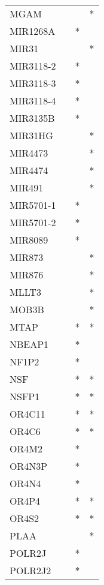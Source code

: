 \begin{longtable}{lccc}
MGAM         &       &    &       * \\
MIR1268A     &       &  * &         \\
MIR31        &       &    &       * \\
MIR3118-2    &       &  * &         \\
MIR3118-3    &       &  * &         \\
MIR3118-4    &       &  * &         \\
MIR3135B     &       &  * &         \\
MIR31HG      &       &    &       * \\
MIR4473      &       &    &       * \\
MIR4474      &       &    &       * \\
MIR491       &       &    &       * \\
MIR5701-1    &       &  * &         \\
MIR5701-2    &       &  * &         \\
MIR8089      &       &  * &         \\
MIR873       &       &    &       * \\
MIR876       &       &    &       * \\
MLLT3        &       &    &       * \\
MOB3B        &       &    &       * \\
MTAP         &       &  * &       * \\
NBEAP1       &       &  * &         \\
NF1P2        &       &  * &         \\
NSF          &       &  * &       * \\
NSFP1        &       &  * &       * \\
OR4C11       &       &  * &       * \\
OR4C6        &       &  * &       * \\
OR4M2        &       &  * &         \\
OR4N3P       &       &  * &         \\
OR4N4        &       &  * &         \\
OR4P4        &       &  * &       * \\
OR4S2        &       &  * &       * \\
PLAA         &       &    &       * \\
POLR2J       &       &  * &         \\
POLR2J2      &       &  * &         \\

\end{longtable}
